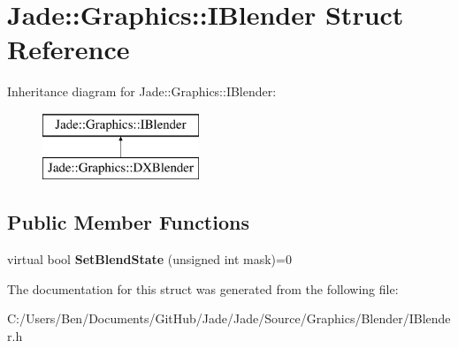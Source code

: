 \hypertarget{struct_jade_1_1_graphics_1_1_i_blender}{}\section{Jade\+:\+:Graphics\+:\+:I\+Blender Struct Reference}
\label{struct_jade_1_1_graphics_1_1_i_blender}
Inheritance diagram for Jade\+:\+:Graphics\+:\+:I\+Blender\+:\begin{figure}[H]
\begin{center}
\leavevmode
\includegraphics[height=2.000000cm]{struct_jade_1_1_graphics_1_1_i_blender}
\end{center}
\end{figure}
\subsection*{Public Member Functions}
\begin{DoxyCompactItemize}
\item 
\hypertarget{struct_jade_1_1_graphics_1_1_i_blender_a9319325ed247f55038d21afc73b11cca}{}virtual bool {\bfseries Set\+Blend\+State} (unsigned int mask)=0\label{struct_jade_1_1_graphics_1_1_i_blender_a9319325ed247f55038d21afc73b11cca}

\end{DoxyCompactItemize}


The documentation for this struct was generated from the following file\+:\begin{DoxyCompactItemize}
\item 
C\+:/\+Users/\+Ben/\+Documents/\+Git\+Hub/\+Jade/\+Jade/\+Source/\+Graphics/\+Blender/I\+Blender.\+h\end{DoxyCompactItemize}
